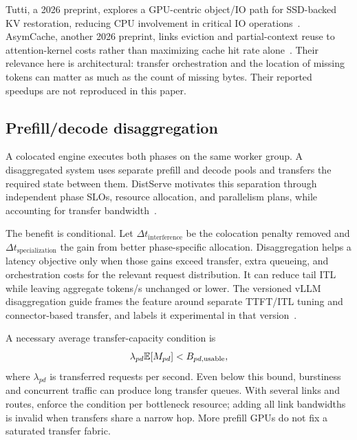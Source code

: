 Tutti, a 2026 preprint, explores a GPU-centric object/IO path for SSD-backed KV
restoration, reducing CPU involvement in critical IO operations~\cite{tutti}.
AsymCache, another 2026 preprint, links eviction and partial-context reuse to
attention-kernel costs rather than maximizing cache hit rate alone~\cite{asym}.
Their relevance here is architectural: transfer orchestration and the location
of missing tokens can matter as much as the count of missing bytes. Their
reported speedups are not reproduced in this paper.

\subsection{Prefill/decode disaggregation}
A colocated engine executes both phases on the same worker group. A
disaggregated system uses separate prefill and decode pools and transfers the
required state between them. DistServe motivates this separation through
independent phase SLOs, resource allocation, and parallelism plans, while
accounting for transfer bandwidth~\cite{distserve}.


The benefit is conditional. Let $\Delta t_{\mathrm{interference}}$ be the
colocation penalty removed and $\Delta t_{\mathrm{specialization}}$ the gain
from better phase-specific allocation. Disaggregation helps a latency objective
only when those gains exceed transfer, extra queueing, and orchestration costs
for the relevant request distribution. It can reduce tail ITL while leaving
aggregate tokens/s unchanged or lower. The versioned vLLM disaggregation guide
frames the feature around separate TTFT/ITL tuning and connector-based
transfer, and labels it experimental in that version~\cite{vdisagg}.

A necessary average transfer-capacity condition is
\begin{equation}
 \lambda_{pd}\mathbb{E}[M_{pd}] < B_{pd,\mathrm{usable}},
\end{equation}
where $\lambda_{pd}$ is transferred requests per second. Even below this bound,
burstiness and concurrent traffic can produce long transfer queues. With several
links and routes, enforce the condition per bottleneck resource; adding all link
bandwidths is invalid when transfers share a narrow hop. More prefill GPUs do
not fix a saturated transfer fabric.

